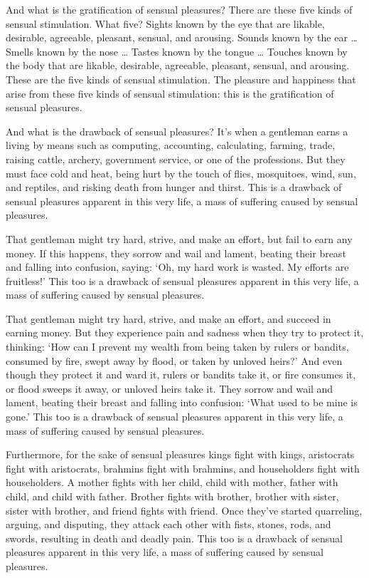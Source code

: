 \documentclass[12pt,openany]{book}%
\begin{document}
And what is the gratification of sensual pleasures? There are these five kinds of sensual stimulation. What five? Sights known by the eye that are likable, desirable, agreeable, pleasant, sensual, and arousing. Sounds known by the ear … Smells known by the nose … Tastes known by the tongue … Touches known by the body that are likable, desirable, agreeable, pleasant, sensual, and arousing. These are the five kinds of sensual stimulation. The pleasure and happiness that arise from these five kinds of sensual stimulation: this is the gratification of sensual pleasures. 

And what is the drawback of sensual pleasures? It’s when a gentleman earns a living by means such as computing, accounting, calculating, farming, trade, raising cattle, archery, government service, or one of the professions. But they must face cold and heat, being hurt by the touch of flies, mosquitoes, wind, sun, and reptiles, and risking death from hunger and thirst. This is a drawback of sensual pleasures apparent in this very life, a mass of suffering caused by sensual pleasures. 

That gentleman might try hard, strive, and make an effort, but fail to earn any money. If this happens, they sorrow and wail and lament, beating their breast and falling into confusion, saying: ‘Oh, my hard work is wasted. My efforts are fruitless!’ This too is a drawback of sensual pleasures apparent in this very life, a mass of suffering caused by sensual pleasures. 

That gentleman might try hard, strive, and make an effort, and succeed in earning money. But they experience pain and sadness when they try to protect it, thinking: ‘How can I prevent my wealth from being taken by rulers or bandits, consumed by fire, swept away by flood, or taken by unloved heirs?’ And even though they protect it and ward it, rulers or bandits take it, or fire consumes it, or flood sweeps it away, or unloved heirs take it. They sorrow and wail and lament, beating their breast and falling into confusion: ‘What used to be mine is gone.’ This too is a drawback of sensual pleasures apparent in this very life, a mass of suffering caused by sensual pleasures. 

Furthermore, for the sake of sensual pleasures kings fight with kings, aristocrats fight with aristocrats, brahmins fight with brahmins, and householders fight with householders. A mother fights with her child, child with mother, father with child, and child with father. Brother fights with brother, brother with sister, sister with brother, and friend fights with friend. Once they’ve started quarreling, arguing, and disputing, they attack each other with fists, stones, rods, and swords, resulting in death and deadly pain. This too is a drawback of sensual pleasures apparent in this very life, a mass of suffering caused by sensual pleasures. 
\end{document}
